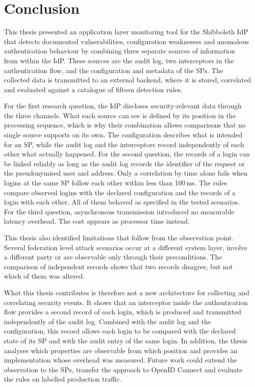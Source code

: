 \documentclass[../main.tex]{subfiles}
\begin{document}
\chapter{Conclusion}\label{ch:conclusion}

This thesis presented an application layer monitoring tool for the Shibboleth IdP that detects 
documented vulnerabilities, configuration weaknesses and anomalous authentication behaviour by 
combining three separate sources of information from within the IdP. 
These sources are the audit log, two interceptors in the authentication flow, and the configuration 
and metadata of the SPs. 
The collected data is transmitted to an external backend, where it is stored, correlated and 
evaluated against a catalogue of fifteen detection rules. 

For the first research question, the IdP discloses security-relevant data through the three channels. 
What each source can see is defined by its position in the processing sequence, which is why their 
combination allows comparisons that no single source supports on its own. 
The configuration describes what is intended for an SP, while the audit log and the interceptors 
record independently of each other what actually happened. 
For the second question, the records of a login can be linked reliably as long as the audit log records 
the identifier of the request or the pseudonymised user and address. 
Only a correlation by time alone fails when logins at the same SP follow each other within less than 100\,ms. 
The rules compare observed logins with the declared configuration and the records of a login with each other. 
All of them behaved as specified in the tested scenarios. 
For the third question, asynchronous transmission introduced no measurable latency overhead. 
The cost appears as processor time instead. 

This thesis also identified limitations that follow from the observation point. 
Several federation level attack scenarios occur at a different system layer, involve a different 
party or are observable only through their preconditions. 
The comparison of independent records shows that two records disagree, but not which of them was 
altered. 

What this thesis contributes is therefore not a new architecture for collecting and correlating 
security events. 
It shows that an interceptor inside the authentication flow provides a second record of each login, 
which is produced and transmitted independently of the audit log. 
Combined with the audit log and the configuration, this record allows each login to be compared with 
the declared state of its SP and with the audit entry of the same login. 
In addition, the thesis analyses which properties are observable from which position and provides 
an implementation whose overhead was measured. 
Future work could extend the observation to the SPs, transfer the approach to OpenID Connect and 
evaluate the rules on labelled production traffic. 
\end{document}
